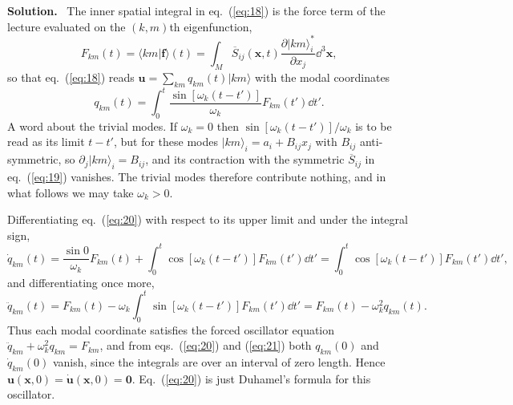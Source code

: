 \documentclass[a4paper,12pt]{paper}
\newenvironment{solution}{\par\noindent\textbf{Solution.}\ }{\par\medskip}
\begin{document}
\begin{solution}
The inner spatial integral in eq.~(\ref{eq:18}) is the force term of the lecture evaluated on the
$(k,m)$th eigenfunction,
\begin{equation}
F_{km}(t)=\langle km|\mathbf{f}\rangle(t)=\int_{M}\overline{S}_{ij}(\mathbf{x},t)\frac{\partial|km\rangle_{i}^{*}}{\partial x_{j}}\dd^{3}\mathbf{x},
\label{eq:19}
\end{equation}
so that eq.~(\ref{eq:18}) reads $\mathbf{u}=\sum_{km}q_{km}(t)|km\rangle$ with the modal coordinates
\begin{equation}
q_{km}(t)=\int_{0}^{t}\frac{\sin[\omega_{k}(t-t')]}{\omega_{k}}F_{km}(t')\dd t'.
\label{eq:20}
\end{equation}
A word about the trivial modes. If $\omega_{k}=0$ then $\sin[\omega_{k}(t-t')]/\omega_{k}$ is to be read
as its limit $t-t'$, but for these modes $|km\rangle_{i}=a_{i}+B_{ij}x_{j}$ with $B_{ij}$ anti-symmetric,
so $\partial_{j}|km\rangle_{i}=B_{ij}$, and its contraction with the symmetric $\overline{S}_{ij}$ in
eq.~(\ref{eq:19}) vanishes. The trivial modes therefore contribute nothing, and in what follows we
may take $\omega_{k}>0$.

Differentiating eq.~(\ref{eq:20}) with respect to its upper limit and under the integral sign,
\begin{equation}
\dot{q}_{km}(t)=\frac{\sin 0}{\omega_{k}}F_{km}(t)+\int_{0}^{t}\cos[\omega_{k}(t-t')]F_{km}(t')\dd t'
=\int_{0}^{t}\cos[\omega_{k}(t-t')]F_{km}(t')\dd t',
\label{eq:21}
\end{equation}
and differentiating once more,
\begin{equation}
\ddot{q}_{km}(t)=F_{km}(t)-\omega_{k}\int_{0}^{t}\sin[\omega_{k}(t-t')]F_{km}(t')\dd t'
=F_{km}(t)-\omega_{k}^{2}q_{km}(t).
\label{eq:22}
\end{equation}
Thus each modal coordinate satisfies the forced oscillator equation
$\ddot{q}_{km}+\omega_{k}^{2}q_{km}=F_{km}$, and from eqs.~(\ref{eq:20}) and (\ref{eq:21}) both
$q_{km}(0)$ and $\dot{q}_{km}(0)$ vanish, since the integrals are over an interval of zero length.
Hence $\mathbf{u}(\mathbf{x},0)=\dot{\mathbf{u}}(\mathbf{x},0)=\mathbf{0}$. Eq.~(\ref{eq:20}) is just
Duhamel's formula for this oscillator.


\end{solution}
\end{document}
